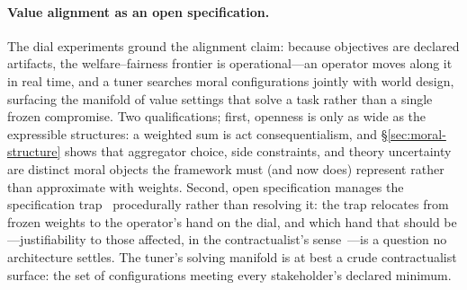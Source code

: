 \documentclass[11pt]{article}
\begin{document}
\paragraph{Value alignment as an open specification.} The dial experiments
ground the alignment claim: because objectives are declared artifacts, the
welfare--fairness frontier is operational---an operator moves along it
in real time, and a tuner searches moral configurations jointly with world
design, surfacing the manifold of value settings that solve a task rather
than a single frozen compromise. Two qualifications; first, openness is only as wide as the expressible
structures: a weighted sum is act consequentialism, and
\S\ref{sec:moral-structure} shows that aggregator choice, side constraints,
and theory uncertainty are distinct moral objects the framework must (and
now does) represent rather than approximate with weights. Second, open
specification manages the specification trap~\cite{spectrap2025}
procedurally rather than resolving it: the trap relocates from frozen
weights to the operator's hand on the dial, and which hand that should
be---justifiability to those affected, in the contractualist's
sense~\cite{scanlon1998}---is a question no architecture settles. The
tuner's solving manifold is at best a crude contractualist surface: the set
of configurations meeting every stakeholder's declared minimum.
\end{document}
